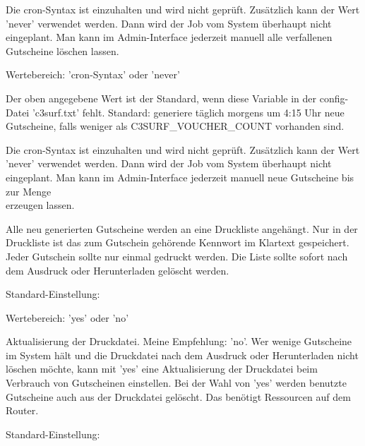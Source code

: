 \begin{description}
  Die cron-Syntax ist einzuhalten und wird nicht geprüft. Zusätzlich kann der Wert 'never' verwendet werden.
  Dann wird der Job vom System überhaupt nicht eingeplant. Man kann im Admin-Interface jederzeit manuell
  alle verfallenen Gutscheine löschen lassen.


   
   Wertebereich: 'cron-Syntax' oder 'never'
  
  Der oben angegebene Wert ist der Standard, wenn diese Variable in der config-Datei
  'c3surf.txt' fehlt.
  Standard: generiere täglich morgens um 4:15 Uhr neue Gutscheine, falls weniger als C3SURF\_VOUCHER\_COUNT
  vorhanden sind.
  
  Die cron-Syntax ist einzuhalten und wird nicht geprüft. Zusätzlich kann der Wert 'never' verwendet werden.
  Dann wird der Job vom System überhaupt nicht eingeplant. Man kann im Admin-Interface jederzeit manuell
  neue Gutscheine bis zur Menge\\
   erzeugen lassen.
  
  Alle neu generierten Gutscheine werden an eine Druckliste angehängt. Nur in der Druckliste ist das zum
  Gutschein gehörende Kennwort im Klartext gespeichert. Jeder Gutschein sollte nur einmal gedruckt werden.
  Die Liste sollte sofort nach dem Ausdruck oder Herunterladen gelöscht werden.

   
   Standard-Einstellung: 
   
   Wertebereich: 'yes' oder 'no'
   
   Aktualisierung der Druckdatei. Meine Empfehlung: 'no'. Wer wenige Gutscheine im System hält und
   die Druckdatei nach dem Ausdruck oder Herunterladen nicht löschen möchte, kann mit 'yes' eine
   Aktualisierung der Druckdatei beim Verbrauch von Gutscheinen einstellen. Bei der Wahl von 'yes' werden
   benutzte Gutscheine auch aus der Druckdatei gelöscht. Das benötigt Ressourcen auf dem Router.
   
   
   Standard-Einstellung: 
   

\end{description}
